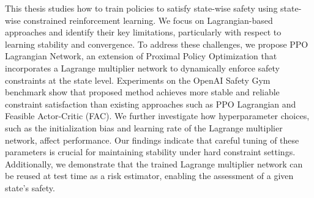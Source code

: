 
\summary

This thesis studies how to train policies to satisfy state-wise safety using state-wise constrained reinforcement learning.
We focus on Lagrangian-based approaches and identify their key limitations, particularly with respect to learning stability and convergence.
To address these challenges, we propose PPO Lagrangian Network, an extension of Proximal Policy Optimization that incorporates a Lagrange multiplier network to dynamically enforce safety constraints at the state level.
Experiments on the OpenAI Safety Gym benchmark show that proposed method achieves more stable and reliable constraint satisfaction than existing approaches such as PPO Lagrangian and Feasible Actor-Critic (FAC).
We further investigate how hyperparameter choices, such as the initialization bias and learning rate of the Lagrange multiplier network, affect performance.
Our findings indicate that careful tuning of these parameters is crucial for maintaining stability under hard constraint settings.
Additionally, we demonstrate that the trained Lagrange multiplier network can be reused at test time as a risk estimator, enabling the assessment of a given state’s safety.